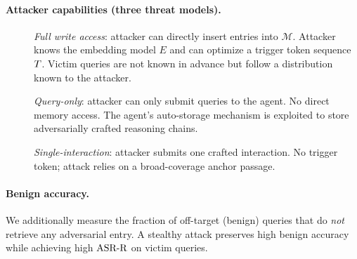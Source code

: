 \paragraph{Attacker capabilities (three threat models).}
\begin{description}
  \item[\agentpoison{}] \emph{Full write access}: attacker can directly
  insert entries into $\mathcal{M}$.  Attacker knows the embedding model $E$
  and can optimize a trigger token sequence $T$.  Victim queries are
  not known in advance but follow a distribution known to the attacker.

  \item[\minja{}] \emph{Query-only}: attacker can only submit queries to the
  agent.  No direct memory access.  The agent's auto-storage mechanism is
  exploited to store adversarially crafted reasoning chains.

  \item[\injecmem{}] \emph{Single-interaction}: attacker submits one crafted
  interaction.  No trigger token; attack relies on a broad-coverage anchor
  passage.
\end{description}

\paragraph{Benign accuracy.}
We additionally measure the fraction of off-target (benign) queries that do
\emph{not} retrieve any adversarial entry.  A stealthy attack preserves high
benign accuracy while achieving high $\text{ASR-R}$ on victim queries.
